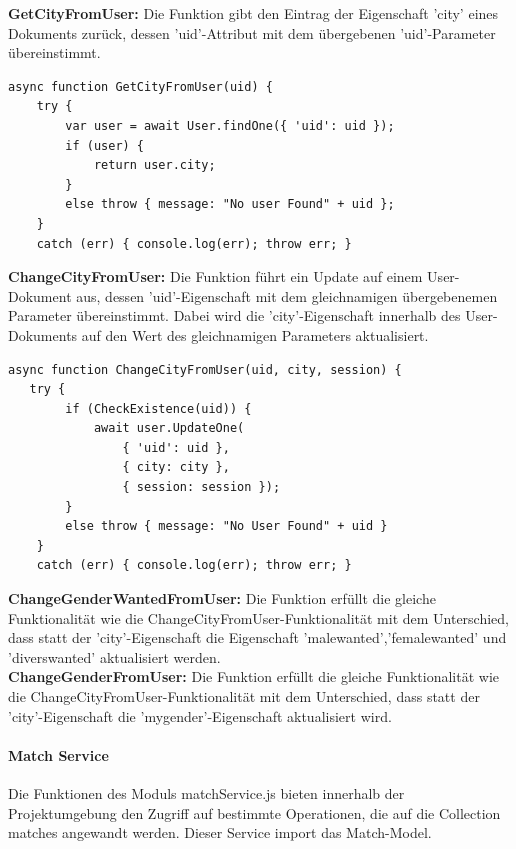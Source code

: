 \noindent
\textbf{GetCityFromUser:}
Die Funktion gibt den Eintrag der Eigenschaft 'city' eines Dokuments zurück, dessen 'uid'-Attribut mit dem übergebenen 'uid'-Parameter übereinstimmt.\\

\begin{lstlisting}[caption=User Service - CheckExistence, label=lst:userservicecheckexistence]
async function GetCityFromUser(uid) {
    try {
        var user = await User.findOne({ 'uid': uid });
        if (user) {
            return user.city;
        }
        else throw { message: "No user Found" + uid };
    }
    catch (err) { console.log(err); throw err; }
\end{lstlisting}

\noindent
\textbf{ChangeCityFromUser:}
Die Funktion führt ein Update auf einem User-Dokument aus, dessen 'uid'-Eigenschaft mit dem gleichnamigen übergebenemen Parameter übereinstimmt. Dabei wird die 'city'-Eigenschaft innerhalb des User-Dokuments auf den Wert des gleichnamigen Parameters aktualisiert.\\

\begin{lstlisting}[caption=User Service - ChangeCityFromUser, label=lst:userservicechangecityfromuser]
async function ChangeCityFromUser(uid, city, session) {  
   try {
        if (CheckExistence(uid)) {
            await user.UpdateOne(
                { 'uid': uid },
                { city: city },
                { session: session });
        }
        else throw { message: "No User Found" + uid }
    }
    catch (err) { console.log(err); throw err; }
\end{lstlisting}

\noindent
\textbf{ChangeGenderWantedFromUser:}
Die Funktion erfüllt die gleiche Funktionalität wie die ChangeCityFromUser-Funktionalität mit dem Unterschied, dass statt der 'city'-Eigenschaft die Eigenschaft 'malewanted','femalewanted' und 'diverswanted' aktualisiert werden.\\

\noindent
\textbf{ChangeGenderFromUser:}
Die Funktion erfüllt die gleiche Funktionalität wie die ChangeCityFromUser-Funktionalität mit dem Unterschied, dass statt der 'city'-Eigenschaft die 'mygender'-Eigenschaft aktualisiert wird.\\


%
%


\paragraph{Match Service}
Die Funktionen des Moduls matchService.js bieten innerhalb der Projektumgebung den Zugriff auf bestimmte Operationen, die auf die Collection matches angewandt werden. Dieser Service import das Match-Model.

